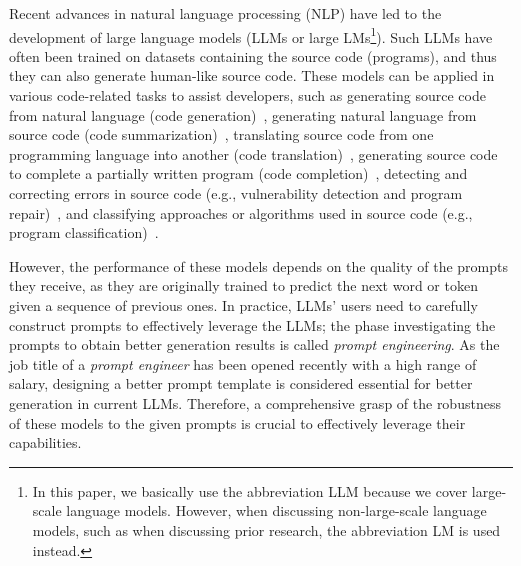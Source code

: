 \documentclass{article}
\begin{document}
Recent advances in natural language processing (NLP) have led to the development of large language models
(LLMs or large LMs\footnote{In this paper, we basically use the abbreviation LLM because we cover large-scale language models. However, when discussing non-large-scale language models, such as when discussing prior research, the abbreviation LM is used instead.}).
Such LLMs have often been trained on datasets containing the source code (programs), and thus they can also generate human-like source code.
These models can be applied in various code-related tasks to assist developers, such as
generating source code from natural language (code generation)~\citep{chen2021codex, parvez2021retrieval, nijkamp2022codegen, fried2022incoder, li2022alphacode, chen2022codet, chowdhery2022palm, christopoulou2022pangucoder, le2022coderl, xu2022polycoder, wang2021codet5, wei2019dual},
generating natural language from source code (code summarization)~\citep{chen2021codex, parvez2021retrieval, fried2022incoder, wang2021codet5, wei2019dual, lu2021codexglue},
translating source code from one programming language into another (code translation)~\citep{lu2021codexglue, ahmad2021plbart, roziere2020transcoder, roziere2022transcoder-st},
generating source code to complete a partially written program (code completion)~\citep{chen2021codex, nijkamp2022codegen, fried2022incoder, li2022alphacode, lu2021codexglue, svyatkovskiy2020intellicode, terada2021completion},
detecting and correcting errors in source code (e.g., vulnerability detection and program repair)~\citep{lu2021codexglue, berabi2021tfix, rahman2021repair, matsumoto2021repair, prenner2021repair, pearce2021securitybugs, joshi2022repair},
and classifying approaches or algorithms used in source code (e.g., program classification)~\citep{shalaby2017algorithm, chourasia2022algorithm, watanobe2023algorithm}.

However, the performance of these models depends on the quality of the prompts they receive, as they are originally trained to predict the next word or token given a sequence of previous ones.
In practice, LLMs' users need to carefully construct prompts to effectively leverage the LLMs; the phase investigating the prompts to obtain better generation results is called \textit{prompt engineering}.
As the job title of a \textit{prompt engineer} has been opened recently with a high range of salary, designing a better prompt template is considered essential for better generation in current LLMs.
Therefore, a comprehensive grasp of the robustness of these models to the given prompts is crucial to effectively leverage their capabilities.
\end{document}

